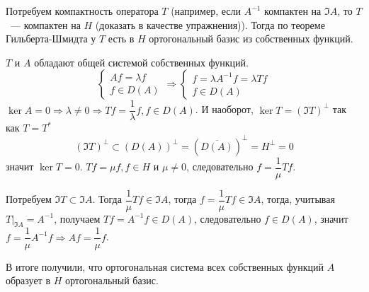 \documentclass[14pt]{extarticle}
\begin{document}
Потребуем компактность оператора $T$ (например, если $A^{-1}$ компактен на $\Im A$,
то $T$~--- компактен на $H$ (доказать в качестве упражнения)).
Тогда по теореме Гильберта-Шмидта у $T$ есть в $H$ ортогональный базис из
собственных функций.

$T$ и $A$ обладают общей системой собственных функций.
$$
    \left\{
    \begin{array}{l}
        Af = \lambda f\\
        f \in D(A)
    \end{array}
    \right. \Rightarrow
    \left\{
    \begin{array}{l}
        f = \lambda A^{-1}f = \lambda T f\\
        f \in D(A)
    \end{array}
    \right.
$$
$\ker A = 0 \Rightarrow \lambda \ne 0 \Rightarrow Tf = \dfrac{1}{\lambda}f, f \in D(A)$.
И наоборот, $\ker T = (\Im T)^\perp$ так как $T = T^*$
$$
(\Im T)^\perp \subset (D(A))^\perp = \left(\overline{D(A)}\right)^\perp = H^\perp = 0
$$
значит $\ker T = 0$.
$Tf =\mu f, f \in H$ и $\mu \ne 0$, следовательно $f = \dfrac{1}{\mu}Tf$.

Потребуем $\Im T \subset \Im A$.
Тогда $\dfrac{1}{\mu}Tf \in \Im A$, тогда $f = \dfrac{1}{\mu}Tf \in \Im A$, тогда, учитывая
$T|_{\Im A} = A^{-1}$,  получаем $Tf = A^{-1}f \in 
D(A)$, следовательно $f \in D(A)$, значит $f = \dfrac{1}{\mu}A^{-1}f \Rightarrow Af =\dfrac{1}
{\mu}f$.

В итоге получили, что ортогональная система всех собственных функций $A$ образует
в $H$ ортогональный базис.
\end{document}
